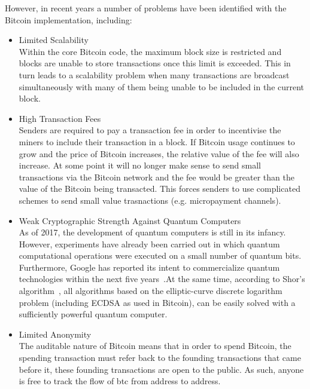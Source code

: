 \documentclass[a4paper,10pt,twocolumn]{article}
\begin{document}
However, in recent years a number of problems have been identified with the Bitcoin implementation, including:
\vspace{-0.5\baselineskip}
\begin{itemize}
	\setlength\itemsep{0em}
	\item{Limited Scalability}\mbox{}\\ 
	Within the core Bitcoin code, the maximum block size is restricted and blocks are unable to store transactions once this limit 
	is exceeded. This in turn leads to a scalability problem when many transactions are broadcast simultaneously with many of them 
	being unable to be included in the current block.
	\item{High Transaction Fees}\mbox{}\\ 
	Senders are required to pay a transaction fee in order to incentivise the miners to include their transaction in a block.
	If Bitcoin usage continues to grow and the price of Bitcoin increases, the relative value of the fee will also increase. At some
	point it will no longer make sense to send small transactions via the Bitcoin network and the fee would be greater than the 
	value of the Bitcoin being transacted. This forces senders to use complicated schemes to send small value trasnactions (e.g. 
	micropayment channels).
	\item{Weak Cryptographic Strength Against Quantum Computers}\mbox{}\\ 
	As of 2017, the development of quantum computers is still in its infancy. However, experiments have already been carried out in 
	which quantum computational operations were executed on a small number of quantum bits. Furthermore, Google has reported its 
	intent to commercialize quantum technologies within the next five years~\cite{google}.At the same time, according to Shor's 
	algorithm~\cite{shor}, all algorithms based on the elliptic-curve discrete logarithm problem (including ECDSA as used in 
	Bitcoin), can be easily solved with a sufficiently powerful quantum computer. 
	\item{Limited Anonymity}\mbox{}\\ 
	The auditable nature of Bitcoin means that in order to spend Bitcoin, the spending transaction must refer back to the founding
	transactions that came before it, these founding transactions are open to the public. As such, anyone is free to track the flow
	of btc from address to address.
\end{itemize}
\end{document}
